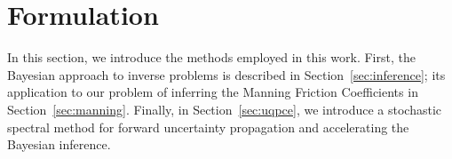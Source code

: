 \section{Formulation}
\label{sec:formu}
In this section, we introduce the methods employed in this work.
First, the Bayesian approach to inverse problems is described in Section~\ref{sec:inference};
its application to our problem of inferring the Manning Friction Coefficients in Section~\ref{sec:manning}.
Finally, in Section~\ref{sec:uqpce}, we introduce
a stochastic spectral method for forward uncertainty propagation and accelerating the Bayesian inference.





